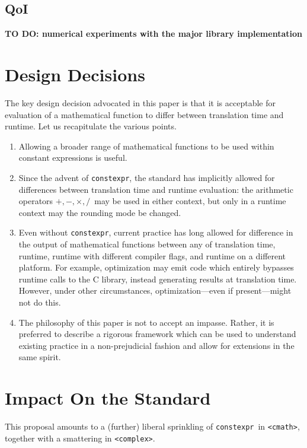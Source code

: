 \documentclass[prd,twocolumn,amsmath,amssymb,nofootinbib,eqsecnum]{revtex4-1}
\newcommand{\constexpr}{\code{constexpr}\xspace}
\newcommand{\code}[1]{{\tt #1}}
\newcommand{\header}[1]{{\tt <#1>}}
\newcommand{\cmath}{\header{cmath}}
\newcommand{\complex}{\header{complex}}
\newcommand{\Operators}{\ensuremath{+,-,\times,/}}
\begin{document}
\subsection{QoI}

{\bf TO DO: numerical experiments with the major library implementation}


\section{Design Decisions}

The key design decision advocated in this paper is that it is acceptable for evaluation of a mathematical function to differ between translation time and runtime. Let us recapitulate the various points.

\begin{enumerate}
	\item Allowing a broader range of mathematical functions to be used within constant expressions is useful.
	
	\item Since the advent of \constexpr, the standard has implicitly allowed for differences between translation time and runtime evaluation: the arithmetic operators \Operators\ may be used in either context, but only in a runtime context may the rounding mode be changed.
	
	\item Even without \constexpr, current practice has long allowed for difference in the output of mathematical functions between any of translation time, runtime, runtime with different compiler flags, and runtime on a different platform. For example, optimization may emit code which entirely bypasses runtime calls to the C library, instead generating results at translation time. However, under other circumstances, optimization---even if present---might not do this.
	
	\item The philosophy of this paper is not to accept an impasse. Rather, it is preferred to describe a rigorous framework which can be used to understand existing practice in a non-prejudicial fashion and allow for extensions in the same spirit.
\end{enumerate}


\section{Impact On the Standard}

This proposal amounts to a (further) liberal sprinkling of \constexpr\ in \cmath, together with a smattering in \complex.
\end{document}
